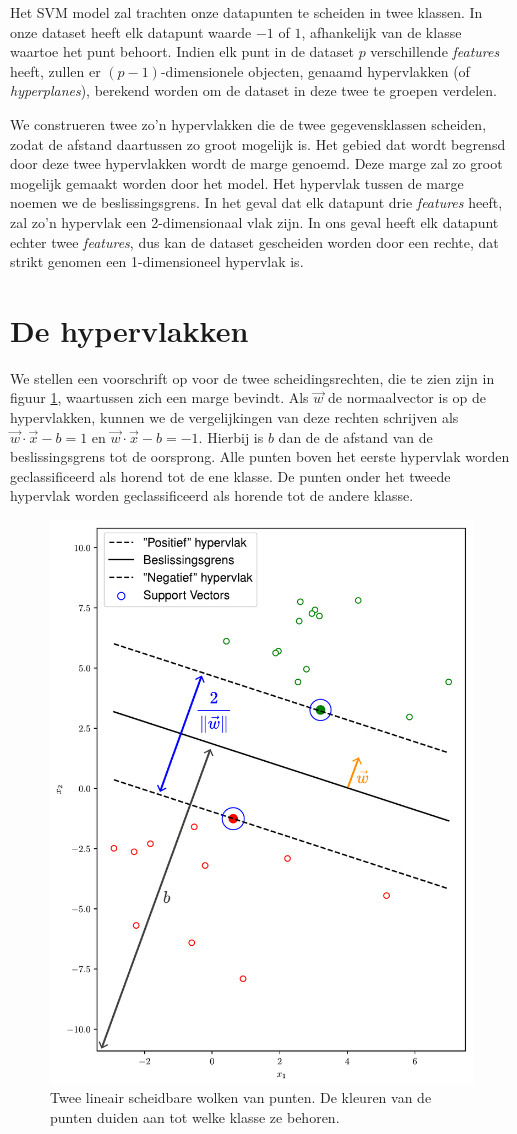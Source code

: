 \documentclass[twoside, kulak]{kulakreport}
\begin{document}
	Het SVM model zal trachten onze datapunten te scheiden in twee klassen. In onze dataset heeft elk datapunt waarde \(-1\) of \(1\), afhankelijk van de klasse waartoe het punt behoort. Indien elk punt in de dataset \(p\) verschillende \textit{features} heeft, zullen er \((p-1)\)-dimensionele objecten, genaamd hypervlakken (of \textit{hyperplanes}), berekend worden om de dataset in deze twee te groepen verdelen. 
	
	We construeren twee zo'n hypervlakken die de twee gegevensklassen scheiden, zodat de afstand daartussen zo groot mogelijk is. Het gebied dat wordt begrensd door deze twee hypervlakken wordt de marge genoemd. Deze marge zal zo groot mogelijk gemaakt worden door het model. Het hypervlak tussen de marge noemen we de beslissingsgrens.
	In het geval dat elk datapunt drie \textit{features} heeft, zal zo'n hypervlak een 2-dimensionaal vlak zijn. In ons geval heeft elk datapunt echter twee \textit{features}, dus kan de dataset gescheiden worden door een rechte, dat strikt genomen een 1-dimensioneel hypervlak is.
	
	\section{De hypervlakken}
	
	We stellen een voorschrift op voor de twee scheidingsrechten, die te zien zijn in figuur \ref{fig:svm}, waartussen zich een marge bevindt. Als \(\vec{w}\) de normaalvector is op de hypervlakken, kunnen we de vergelijkingen van deze rechten schrijven als \(\vec{w}\cdot \vec{x}-b=1\) en \(\vec{w}\cdot \vec{x}-b=-1\). Hierbij is \(b\) dan de de afstand van de beslissingsgrens tot de oorsprong. Alle punten boven het eerste hypervlak worden geclassificeerd als horend tot de ene klasse. De punten onder het tweede hypervlak worden geclassificeerd als horende tot de andere klasse.
	
	\begin{figure}[h!]
		\centering
		\includegraphics[width=.5\textwidth]{svm}
		\caption{Twee lineair scheidbare wolken van punten. De kleuren van de punten duiden aan tot welke klasse ze behoren.}
		\label{fig:svm}
	\end{figure}
	
\end{document}
